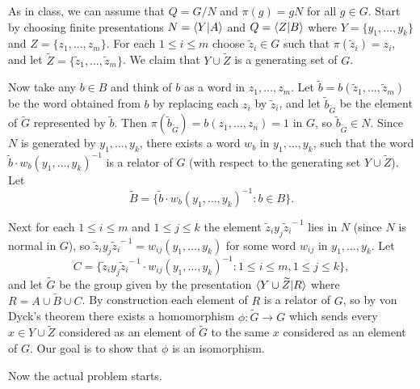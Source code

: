 \documentclass[12pt]{amsart}
\begin{document}
As in class, we can assume that $Q=G/N$ and $\pi(g)=gN$ for all $g\in G$.
Start by choosing finite presentations $N={\langle} Y | A{\rangle}$ and 
$Q={\langle} Z | B{\rangle}$ where $Y=\{y_1,\ldots, y_k\}$ and $Z=\{z_1,\ldots, z_m\}$.
For each $1\leq i\leq m$ choose $\widetilde z_i\in G$ such that 
$\pi(\widetilde z_i)=z_i$, and let 
$\widetilde Z=\{\widetilde z_1,\ldots, \widetilde z_m\}$. We claim
that $Y\cup \widetilde Z$ is a generating set of $G$.

Now take any $b\in B$ and think of $b$ as a word in $z_1,\ldots, z_m$.
Let $\widetilde b= b(\widetilde z_1,\ldots, \widetilde z_m)$ be the word
obtained from $b$ by replacing each $z_i$ by $\widetilde z_i$, and let
$\widetilde b_{\widetilde G}$ be the element of $\widetilde G$ represented by $\widetilde b$.
Then $\pi(\widetilde b_{\widetilde G})=b(z_1,\ldots, z_n)=1$ in $G$, so $\widetilde b_{\widetilde G}\in N$.
Since $N$ is generated by $y_1,\ldots, y_k$, there exists a word $w_b$ in $y_1,\ldots,
y_k$, such that the word $\widetilde b\cdot  w_b(y_1,\ldots, y_k)^{-1}$ is a relator of $G$
(with respect to the generating set $Y\cup \widetilde Z$). Let
$$\widetilde B=\{\widetilde b\cdot  w_b(y_1,\ldots, y_k)^{-1}: b\in B\}.$$

Next for each $1\leq i\leq m$ and $1\leq j\leq k$ the element
$\widetilde z_i y_j \widetilde z_i^{\,-1}$ lies in $N$ (since $N$ is normal in $G$),
so $\widetilde z_i y_j \widetilde z_i^{\,-1}=w_{ij}(y_1,\ldots, y_k)$ for some word $w_{ij}$ in $y_1,\ldots, y_k$. Let
$$C=
\{\widetilde z_i y_j \widetilde z_i^{\,-1}\cdot w_{ij}(y_1,\ldots, y_k)^{-1}: 1\leq i\leq m, 1\leq j\leq k\},$$
and let $\widetilde G$ be the group given by the presentation
${\langle} Y\cup \widetilde Z | R{\rangle}$ where $R= A\cup \widetilde B\cup C$.
By construction each element of $R$ is a relator of $G$, so by von Dyck's theorem there exists a homomorphism $\phi: \widetilde G\to G$ which sends
every $x\in Y\cup \widetilde Z$ considered as an element of $\widetilde G$
to the same $x$ considered as an element of $G$. Our goal is to show that
$\phi$ is an isomorphism.

Now the actual problem starts.
\end{document}
